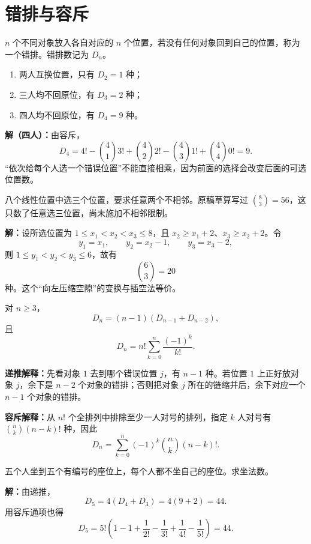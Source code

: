 \section{错排与容斥}

\begin{definitionbox}[错排]
  $n$ 个不同对象放入各自对应的 $n$ 个位置，若没有任何对象回到自己的位置，称为一个错排。错排数记为 $D_n$。
\end{definitionbox}

\begin{examplebox}
  \begin{enumerate}
    \item 两人互换位置，只有 $D_2=1$ 种；
    \item 三人均不回原位，有 $D_3=2$ 种；
    \item 四人均不回原位，有 $D_4=9$ 种。
  \end{enumerate}

  \textbf{解（四人）：}由容斥，
  \[
    D_4=4!-\binom41 3!+\binom42 2!-\binom43 1!+\binom44 0!=9.
  \]
  “依次给每个人选一个错误位置”不能直接相乘，因为前面的选择会改变后面的可选位置数。
\end{examplebox}

\begin{examplebox}
  八个线性位置中选三个位置，要求任意两个不相邻。原稿草算写过 $\binom83=56$，这只数了任意选三位置，尚未施加不相邻限制。

  \textbf{解：}设所选位置为 $1\le x_1<x_2<x_3\le8$，且
  $x_2\ge x_1+2$、$x_3\ge x_2+2$。令
  \[
    y_1=x_1,\qquad y_2=x_2-1,\qquad y_3=x_3-2,
  \]
  则 $1\le y_1<y_2<y_3\le6$，故有
  \[
    \binom63=20
  \]
  种。这个“向左压缩空隙”的变换与插空法等价。
\end{examplebox}

\begin{lawbox}[错排的递推与通项]
  对 $n\ge3$，
  \[
    D_n=(n-1)(D_{n-1}+D_{n-2}),
  \]
  且
  \[
    D_n=n!\sum_{k=0}^{n}\frac{(-1)^k}{k!}.
  \]

  \textbf{递推解释：}先看对象 $1$ 去到哪个错误位置 $j$，有 $n-1$ 种。若位置 $1$ 上正好放对象 $j$，余下是 $n-2$ 个对象的错排；否则把对象 $j$ 所在的链缩并后，余下对应一个 $n-1$ 个对象的错排。

  \textbf{容斥解释：}从 $n!$ 个全排列中排除至少一人对号的排列，指定 $k$ 人对号有 $\binom nk(n-k)!$ 种，因此
  \[
    D_n=\sum_{k=0}^{n}(-1)^k\binom nk(n-k)!.
  \]
\end{lawbox}

\begin{examplebox}
  五个人坐到五个有编号的座位上，每个人都不坐自己的座位。求坐法数。

  \textbf{解：}由递推，
  \[
    D_5=4(D_4+D_3)=4(9+2)=44.
  \]
  用容斥通项也得
  \[
    D_5=5!\left(1-1+\frac1{2!}-\frac1{3!}+\frac1{4!}-\frac1{5!}\right)=44.
  \]
\end{examplebox}

